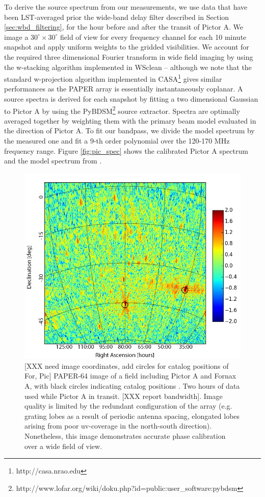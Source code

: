 \documentclass[twocolumn,numberedappendix]{emulateapj} \shorttitle{PSA64}
\begin{document}
To derive the source spectrum from our measurements, we use data that have been LST-averaged
prior the wide-band delay filter described in Section \ref{sec:wbd_filtering}, for the hour
before and after the transit of Pictor A. We image a $30^\circ \times 30^\circ$
field of view for every frequency channel for each 10 minute snapshot and apply
uniform weights to the gridded visibilities. We account for the required three
dimensional Fourier transform in wide field imaging by using the w-stacking
algorithm implemented in WSclean \citep{offringa_et_al2014} – although we note that
the standard w-projection algorithm implemented in
CASA\footnote{http://casa.nrao.edu} gives similar performances as the PAPER
array is essentially instantaneously coplanar.  A source spectra is derived for
each snapshot by fitting a two dimensional Gaussian to Pictor A by using the
PyBDSM\footnote{http://www.lofar.org/wiki/doku.php?id=public:user\_software:pybdsm}
source extractor. Spectra are optimally averaged together by weighting them with
the primary beam model evaluated in the direction of Pictor A. To fit our
bandpass, we divide the model spectrum by the measured one and fit a 9-th order
polynomial over the 120-170 MHz frequency range. Figure \ref{fig:pic_spec} shows
the calibrated Pictor A spectrum and the model spectrum from
\cite{jacobs_et_al2013}.

\begin{figure}[!t]
\centering
\includegraphics[width=\columnwidth]{plots/picimg_cs.png}
\caption{
[XXX need image coordinates, add circles for catalog positions of For, Pic]
PAPER-64 image of a field including Pictor A and Fornax A, with black circles
indicating catalog positions \citep{XXX}. Two hours of data used while Pictor A
in transit.
[XXX report bandwidth].
Image quality is limited by the redundant configuration of the array (e.g. grating lobes
as a result of periodic antenna spacing, elongated lobes
arising from poor uv-coverage in the north-south direction).  Nonetheless, this image
demonstrates accurate phase calibration over a wide field of view.
} \label{fig:field_image}
\end{figure}
\end{document}
